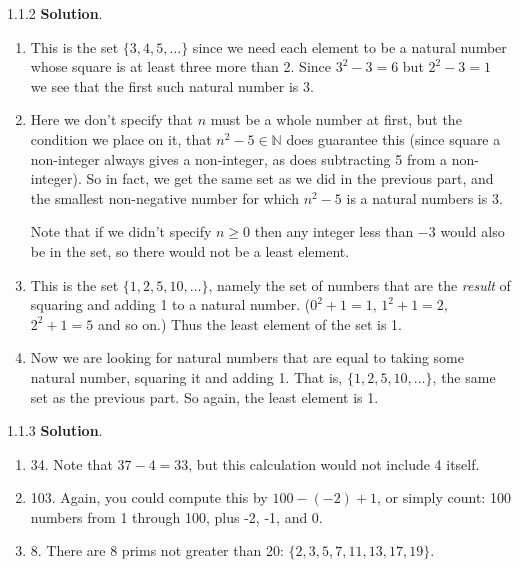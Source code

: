 \documentclass[11pt,]{book}
\theoremstyle{ptxplainnotitle}
\theoremstyle{ptxplaintitle}
\theoremstyle{ptxdefinitionnotitle}
\theoremstyle{ptxdefinitiontitle}
\theoremstyle{ptxdefinitionnotitle}
\theoremstyle{ptxdefinitiontitle}
\theoremstyle{ptxdefinitionnotitle}
\theoremstyle{ptxdefinitiontitle}
\theoremstyle{ptxdefinitiontitlenonumber}
\theoremstyle{ptxdefinitiontitlenonumber}
\numberwithin{equation}{chapter}
\newcommand{\N}{\mathbb N}
\begin{document}
\begin{divisionexercise}{1.1.2}
\textbf{Solution}.\quad%
\hypertarget{p-843}{}%
\leavevmode%
\begin{enumerate}[label=\alph*.]
\item\hypertarget{li-365}{}\hypertarget{p-844}{}%
This is the set \(\{3, 4, 5, \ldots \}\) since we need each element to be a natural number whose square is at least three more than 2.  Since \(3^2 - 3 = 6\) but \(2^2 - 3 = 1\) we see that the first such natural number is 3.%
\item\hypertarget{li-366}{}\hypertarget{p-845}{}%
Here we don't specify that \(n\) must be a whole number at first, but the condition we place on it, that \(n^2 - 5 \in \N\) does guarantee this (since square a non-integer always gives a non-integer, as does subtracting 5 from a non-integer).  So in fact, we get the same set as we did in the previous part, and the smallest non-negative number for which \(n^2 - 5\) is a natural numbers is 3.%
\par
\hypertarget{p-846}{}%
Note that if we didn't specify \(n \ge 0\) then any integer less than \(-3\) would also be in the set, so there would not be a least element.%
\item\hypertarget{li-367}{}\hypertarget{p-847}{}%
This is the set \(\{1, 2, 5, 10, \ldots\}\text{,}\) namely the set of numbers that are the \emph{result} of squaring and adding 1 to a natural number.  (\(0^2 + 1 = 1\text{,}\) \(1^2 + 1 = 2\text{,}\) \(2^2 + 1 = 5\) and so on.)  Thus the least element of the set is 1.%
\item\hypertarget{li-368}{}\hypertarget{p-848}{}%
Now we are looking for natural numbers that are equal to taking some natural number, squaring it and adding 1.  That is, \(\{1, 2, 5, 10, \ldots\}\text{,}\) the same set as the previous part.  So again, the least element is 1.%
\end{enumerate}
%
\end{divisionexercise}%
\begin{divisionexercise}{1.1.3}
\textbf{Solution}.\quad%
\hypertarget{p-861}{}%
\leavevmode%
\begin{enumerate}[label=\alph*.]
\item\hypertarget{li-378}{}\hypertarget{p-862}{}%
34. Note that \(37-4 = 33\text{,}\) but this calculation would not include 4 itself.%
\item\hypertarget{li-379}{}\hypertarget{p-863}{}%
103. Again, you could compute this by \(100-(-2)+1\text{,}\) or simply count: 100 numbers from 1 through 100, plus -2, -1, and 0.%
\item\hypertarget{li-380}{}\hypertarget{p-864}{}%
8. There are 8 prims not greater than 20: \(\{2, 3, 5, 7, 11, 13, 17, 19\}\text{.}\)%
\end{enumerate}
%
\end{divisionexercise}%
\end{document}

